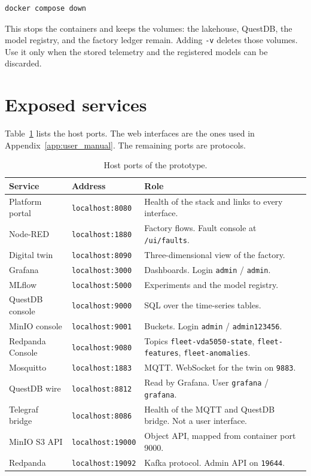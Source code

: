 \begin{lstlisting}[basicstyle=\ttfamily\small,breaklines=true]
docker compose down
\end{lstlisting}

This stops the containers and keeps the volumes: the lakehouse, QuestDB, the model registry, and the factory ledger remain. Adding \texttt{-v} deletes those volumes. Use it only when the stored telemetry and the registered models can be discarded.

\section{Exposed services}
\label{sec:service_ports_ui}

Table~\ref{tab:service_ports} lists the host ports. The web interfaces are the ones used in Appendix~\ref{app:user_manual}. The remaining ports are protocols.

\begin{table}[htbp]
\centering
\small
\caption{Host ports of the prototype.}
\label{tab:service_ports}
\begin{tabularx}{\linewidth}{@{}l l X@{}}
\toprule
\textbf{Service} & \textbf{Address} & \textbf{Role} \\
\midrule
Platform portal & \texttt{localhost:8080} & Health of the stack and links to every interface. \\
\addlinespace
Node-RED & \texttt{localhost:1880} & Factory flows. Fault console at \texttt{/ui/faults}. \\
\addlinespace
Digital twin & \texttt{localhost:8090} & Three-dimensional view of the factory. \\
\addlinespace
Grafana & \texttt{localhost:3000} & Dashboards. Login \texttt{admin} / \texttt{admin}. \\
\addlinespace
MLflow & \texttt{localhost:5000} & Experiments and the model registry. \\
\addlinespace
QuestDB console & \texttt{localhost:9000} & SQL over the time-series tables. \\
\addlinespace
MinIO console & \texttt{localhost:9001} & Buckets. Login \texttt{admin} / \texttt{admin123456}. \\
\addlinespace
Redpanda Console & \texttt{localhost:9080} & Topics \texttt{fleet-vda5050-state}, \texttt{fleet-features}, \texttt{fleet-anomalies}. \\
\midrule
Mosquitto & \texttt{localhost:1883} & MQTT. WebSocket for the twin on \texttt{9883}. \\
\addlinespace
QuestDB wire & \texttt{localhost:8812} & Read by Grafana. User \texttt{grafana} / \texttt{grafana}. \\
\addlinespace
Telegraf bridge & \texttt{localhost:8086} & Health of the MQTT and QuestDB bridge. Not a user interface. \\
\addlinespace
MinIO S3 API & \texttt{localhost:19000} & Object API, mapped from container port 9000. \\
\addlinespace
Redpanda & \texttt{localhost:19092} & Kafka protocol. Admin API on \texttt{19644}. \\
\bottomrule
\end{tabularx}
\end{table}

